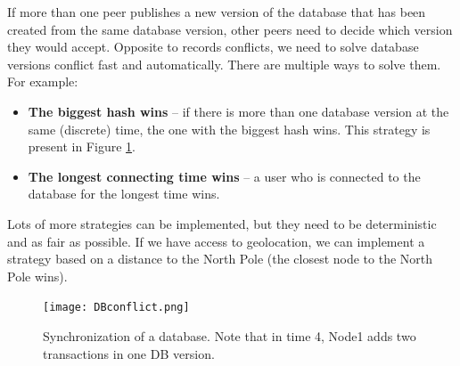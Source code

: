 If more than one peer publishes a new version of the database that has been created from the same database version, other peers need to decide which version they would accept. Opposite to records conflicts, we need to solve database versions conflict fast and automatically. There are multiple ways to solve them. For example: 
\begin{itemize}
    \item \textbf{The biggest hash wins} -- if there is more than one database version at the same (discrete) time, the one with the biggest hash wins. This strategy is present in Figure \ref{databaseConflict}. 
    \item \textbf{The longest connecting time wins} -- a user who is connected to the database for the longest time wins.
\end{itemize}
Lots of more strategies can be implemented, but they need to be deterministic and as fair as possible. If we have access to geolocation, we can implement a strategy based on a distance to the North Pole (the closest node to the North Pole wins).\cite{lamport2019time}

\begin{figure}[h]
    \centering
    \texttt{[image: DBconflict.png]}
    \caption{Synchronization of a database. Note that in time 4, Node1 adds two transactions in one DB version.}
    \label{databaseConflict}
\end{figure}

